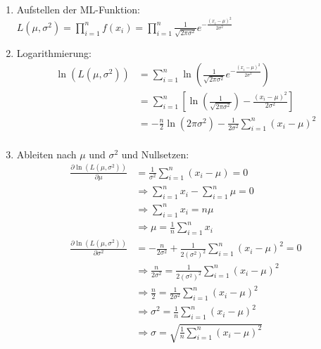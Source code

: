 \begin{enumerate}
    \item Aufstellen der ML-Funktion: \(L(\mu, \sigma^2)=\prod_{i=1}^{n}f(x_i)=\prod_{i=1}^{n}\frac{1}{\sqrt{2\pi\sigma^2}}e^{-\frac{(x_i-\mu)^2}{2\sigma^2}}\)
    \item Logarithmierung:\\
        \begin{equation*}
            \begin{split}
            \ln(L(\mu, \sigma^2))&=\sum_{i=1}^{n}\ln(\frac{1}{\sqrt{2\pi\sigma^2}}e^{-\frac{(x_i-\mu)^2}{2\sigma^2}})\\
            &=\sum_{i=1}^{n}\left [ \ln(\frac{1}{\sqrt{2\pi\sigma^2}})-\frac{(x_i-\mu)^2}{2\sigma^2}\right ]\\
            &=-\frac{n}{2}\ln(2\pi\sigma^2)-\frac{1}{2\sigma^2}\sum_{i=1}^{n}(x_i-\mu)^2\\
            \end{split}
        \end{equation*}
    \item Ableiten nach \(\mu\) und \(\sigma^2\) und Nullsetzen:
        \begin{equation*}
            \begin{split}
            \frac{\partial \ln(L(\mu, \sigma^2))}{\partial \mu}&=\frac{1}{\sigma^2}\sum_{i=1}^{n}(x_i-\mu)=0\\
            &\Rightarrow \sum_{i=1}^{n}x_i-\sum_{i=1}^{n}\mu=0\\
            &\Rightarrow \sum_{i=1}^{n}x_i=n\mu\\
            &\Rightarrow \mu=\frac{1}{n}\sum_{i=1}^{n}x_i\\
            \frac{\partial \ln(L(\mu, \sigma^2))}{\partial \sigma^2}&=-\frac{n}{2\sigma^2}+\frac{1}{2(\sigma^2)^2}\sum_{i=1}^{n}(x_i-\mu)^2=0\\
            &\Rightarrow \frac{n}{2\sigma^2}=\frac{1}{2(\sigma^2)^2}\sum_{i=1}^{n}(x_i-\mu)^2\\
            &\Rightarrow \frac{n}{2}=\frac{1}{2\sigma^2}\sum_{i=1}^{n}(x_i-\mu)^2\\
            &\Rightarrow \sigma^2=\frac{1}{n}\sum_{i=1}^{n}(x_i-\mu)^2\\
            &\Rightarrow \sigma=\sqrt{\frac{1}{n}\sum_{i=1}^{n}(x_i-\mu)^2}\\
            \end{split}
        \end{equation*}
\end{enumerate}

